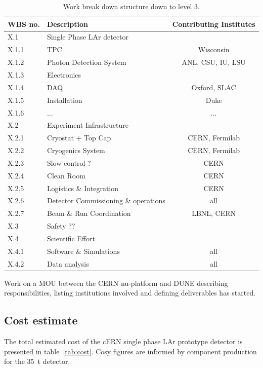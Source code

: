 \begin{table}[h]
\centering
\begin{tabular}{|l l c|}
\hline
\textbf{WBS no. } & \textbf{Description}  & \textbf{Contributing Institutes}  \\ \hline

X.1 & Single Phase LAr detector & \\
X.1.1 & TPC & Wisconsin \\
X.1.2 & Photon Detection System  &  ANL, CSU, IU, LSU \\
X.1.3 & Electronics  &   \\
X.1.4 &  DAQ & Oxford, SLAC  \\
X.1.5 & Installation  & Duke  \\
X.1.6 & ...  & ...  \\ \hline

X.2 & Experiment Infrastructure  &   \\
X.2.1 & Cryostat + Top Cap &  CERN, Fermilab \\
X.2.2 & Cryogenics System  &  CERN, Fermilab \\
X.2.3 &  Slow control ? &  CERN \\
X.2.4 &  Clean Room & CERN   \\ 
X.2.5 &  Logistics \& Integration & CERN  \\ 
X.2.6 &  Detector Commissioning \& operations &  all  \\ 
X.2.7 &  Beam \& Run Coordination &  LBNL, CERN \\ \hline

X.3 &  Safety ?? &   \\ \hline

X.4 & Scientific Effort &    \\ 
X.4.1 & Software \& Simulations &  all  \\
X.4.2 & Data analysis &  all  \\ \hline

\end{tabular}
\caption{Work break down structure down to level 3.}
\label{tab:wbs}
\end{table}
Work on a MOU between the CERN nu-platform and DUNE describing responsibilities, listing institutions involved and defining deliverables has started. 


\subsection{Cost estimate}
The total estimated cost of the cERN single phase LAr prototype detector is presented in table~\ref{tab:cost}.
Cosy figures are informed by component production for the 35~t detector.


